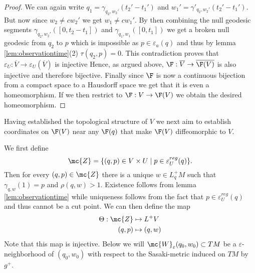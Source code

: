 \begin{proof}
We can again write $q_1=\gamma_{q_2,w_2'}(t_2'-t_1')$ and $w_1'=\gamma'_{q_2,w_2'}(t_2'-t_1')$. But now since $w_2\neq cw_2'$ we get $w_1\neq cw_1'$. By then combining the null geodesic segments $\gamma_{q_2,w_2'}([0,t_2-t_1])$ and $\gamma_{q_1,w_1}([0,t_1])$ we get a broken null geodesic from $q_2$ to $p$ which is impossible as $p\in \varepsilon_a(q)$ and thus by lemma \ref{lem:observationtime}(2) $\tau(q_2,p)=0$. This contradiction proves that $\varepsilon_U:\overline{V}\to \varepsilon_U(\overline{V})$ is injective Hence, as argued above, $\F:\overline{V} \to \overline{\F(V)}$ is also injective and therefore bijective. Finally since $\F$ is now a continuous bijection from a compact space to a Hausdorff space we get that it is even a homeomorphism. If we then restrict to $\F:V\to \F(V)$ we obtain the desired homeomorphism.
\end{proof}

Having established the topological structure of $V$ we next aim to establish coordinates on $\F(V)$ near any $\F(q)$ that make $\F(V)$ diffeomorphic to $V$.

\begin{definition}[Coordinates on $V$]
We first define 
\[
    \mc{Z} = \{(q,p)\in V\times U \mid p\in \varepsilon_U^{reg}(q)\}.
\] 
Then for every $(q,p)\in \mc{Z}$ there is a unique $w\in L^+_qM$ such that $\gamma_{q,w}(1)=p$ and $\rho(q,w)>1$. Existence follows from lemma \ref{lem:observationtime} while uniqueness follows from the fact that $p\in \varepsilon_U^{reg}(q)$ and thus cannot be a cut point. 
We can then define the map
\begin{align*}
    \Theta:\mc{Z}&\mapsto L^+V\\
    (q,p)&\mapsto (q,w)
\end{align*}
Note that this map is injective.
Below we will $\mc{W}_\varepsilon(q_0,w_0)\subset TM$ be a $\varepsilon$-neighborhood of $(q_0,w_0)$ with respect to the Sasaki-metric induced on $TM$ by $g^+$.
\end{definition}

